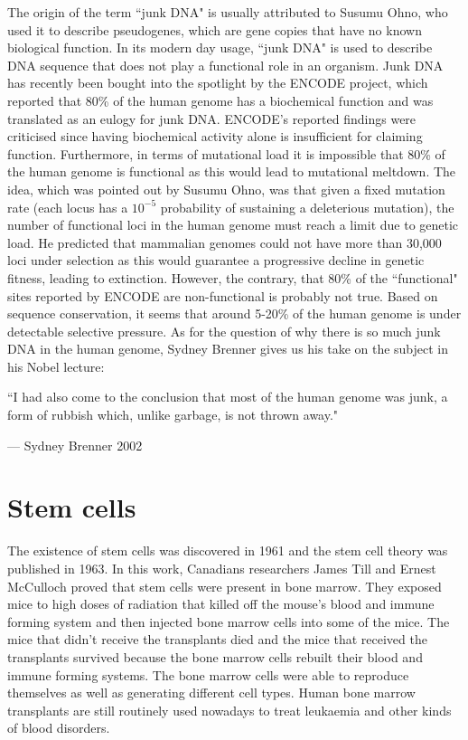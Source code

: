 The origin of the term ``junk DNA" is usually attributed to Susumu Ohno\cite{pmid5065367}, who used it to describe pseudogenes, which are gene copies that have no known biological function. In its modern day usage, ``junk DNA" is used to describe DNA sequence that does not play a functional role in an organism. Junk DNA has recently been bought into the spotlight by the ENCODE project, which reported that 80\% of the human genome has a biochemical function\cite{pmid22955616} and was translated as an eulogy for junk DNA\cite{Pennisi07092012}. ENCODE's reported findings were criticised since having biochemical activity alone is insufficient for claiming function\cite{pmid23431001, pmid23479647, Eddy2012}. Furthermore, in terms of mutational load it is impossible that 80\% of the human genome is functional as this would lead to mutational meltdown\cite{pmid24809441}. The idea, which was pointed out by Susumu Ohno\cite{pmid5065367}, was that given a fixed mutation rate (each locus has a $10^{-5}$ probability of sustaining a deleterious mutation), the number of functional loci in the human genome must reach a limit due to genetic load. He predicted that mammalian genomes could not have more than 30,000 loci under selection as this would guarantee a progressive decline in genetic fitness, leading to extinction. However, the contrary, that 80\% of the ``functional" sites reported by ENCODE are non-functional is probably not true. Based on sequence conservation, it seems that around 5-20\% of the human genome is under detectable selective pressure\cite{Eddy2012}. As for the question of why there is so much junk DNA in the human genome, Sydney Brenner gives us his take on the subject in his Nobel lecture\cite{brennernobellecture}:

\epigraph{``I had also come to the conclusion that most of the human genome was junk, a form of rubbish which, unlike garbage, is not thrown away."}{--- \textup{Sydney Brenner 2002}}

\section{Stem cells}

The existence of stem cells was discovered in 1961 and the stem cell theory was published in 1963\cite{pmid13970094}. In this work, Canadians researchers James Till and Ernest McCulloch proved that stem cells were present in bone marrow. They exposed mice to high doses of radiation that killed off the mouse's blood and immune forming system and then injected bone marrow cells into some of the mice. The mice that didn't receive the transplants died and the mice that received the transplants survived because the bone marrow cells rebuilt their blood and immune forming systems. The bone marrow cells were able to reproduce themselves as well as generating different cell types. Human bone marrow transplants are still routinely used nowadays to treat leukaemia and other kinds of blood disorders.

